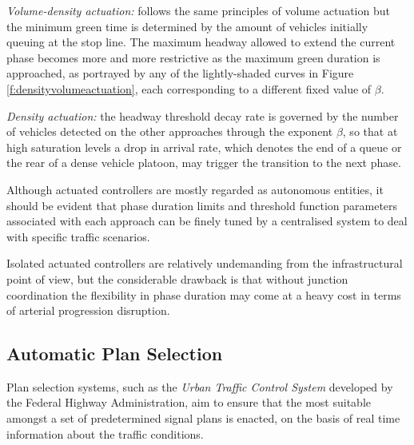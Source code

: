 \textit{Volume-density actuation:} follows the same principles of volume actuation but the
minimum green time is determined by the amount of vehicles initially queuing at the stop
line. The maximum headway allowed to extend the current phase becomes more and more restrictive as the maximum green duration is approached, as portrayed by any of the lightly-shaded curves in Figure \ref{f:densityvolumeactuation}, each corresponding to a different fixed value of $\beta$.

\textit{Density actuation:} the headway threshold decay rate is governed by the number of vehicles detected on the other approaches through the exponent $\beta$, so that at high saturation levels a drop in arrival rate, which denotes the end of a queue or the rear of a dense vehicle platoon, may trigger the transition to the next phase.


Although actuated controllers are mostly regarded as autonomous entities, it should be evident that phase duration limits and threshold function parameters associated with each approach can be finely tuned by a centralised system to deal with specific traffic scenarios.

Isolated actuated controllers are relatively undemanding from the infrastructural point of view, but the considerable drawback is that without junction coordination the flexibility in phase duration may come at a heavy cost in terms of arterial progression disruption.


\subsection{Automatic Plan Selection}
Plan selection systems, such as the \emph{Urban Traffic Control System} developed by the Federal Highway Administration, aim to ensure that the most suitable amongst a set of predetermined signal plans is enacted, on the basis of real time information about the traffic conditions.

